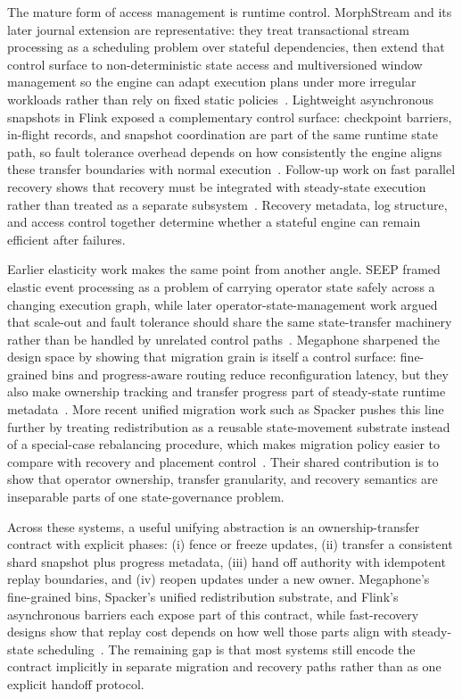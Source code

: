 \documentclass[acmsmall,screen,review]{acmart}
\begin{document}
The mature form of access management is runtime control. MorphStream and its later journal extension are representative: they treat transactional stream processing as a scheduling problem over stateful dependencies, then extend that control surface to non-deterministic state access and multiversioned window management so the engine can adapt execution plans under more irregular workloads rather than rely on fixed static policies~\cite{mao2023morphstream,zhao2025morphstream}. Lightweight asynchronous snapshots in Flink exposed a complementary control surface: checkpoint barriers, in-flight records, and snapshot coordination are part of the same runtime state path, so fault tolerance overhead depends on how consistently the engine aligns these transfer boundaries with normal execution~\cite{carbone2015asynchronous}. Follow-up work on fast parallel recovery shows that recovery must be integrated with steady-state execution rather than treated as a separate subsystem~\cite{zhao2024recovery}. Recovery metadata, log structure, and access control together determine whether a stateful engine can remain efficient after failures.

Earlier elasticity work makes the same point from another angle. SEEP framed elastic event processing as a problem of carrying operator state safely across a changing execution graph, while later operator-state-management work argued that scale-out and fault tolerance should share the same state-transfer machinery rather than be handled by unrelated control paths~\cite{fernandez2010seep,fernandez2013osm}. Megaphone sharpened the design space by showing that migration grain is itself a control surface: fine-grained bins and progress-aware routing reduce reconfiguration latency, but they also make ownership tracking and transfer progress part of steady-state runtime metadata~\cite{nasir2019megaphone}. More recent unified migration work such as Spacker pushes this line further by treating redistribution as a reusable state-movement substrate instead of a special-case rebalancing procedure, which makes migration policy easier to compare with recovery and placement control~\cite{mao2025spacker}. Their shared contribution is to show that operator ownership, transfer granularity, and recovery semantics are inseparable parts of one state-governance problem.

Across these systems, a useful unifying abstraction is an ownership-transfer contract with explicit phases: (i) fence or freeze updates, (ii) transfer a consistent shard snapshot plus progress metadata, (iii) hand off authority with idempotent replay boundaries, and (iv) reopen updates under a new owner. Megaphone's fine-grained bins, Spacker's unified redistribution substrate, and Flink's asynchronous barriers each expose part of this contract, while fast-recovery designs show that replay cost depends on how well those parts align with steady-state scheduling~\cite{nasir2019megaphone,mao2025spacker,carbone2015asynchronous,zhao2024recovery}. The remaining gap is that most systems still encode the contract implicitly in separate migration and recovery paths rather than as one explicit handoff protocol.
\end{document}

